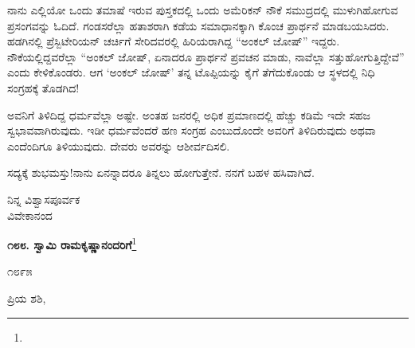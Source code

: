 ನಾನು ಎಲ್ಲಿಯೋ ಒಂದು ತಮಾಷೆ ಇರುವ ಪುಸ್ತಕದಲ್ಲಿ ಒಂದು ಅಮೆರಿಕನ್ ನೌಕೆ ಸಮುದ್ರದಲ್ಲಿ ಮುಳುಗಿಹೋಗುವ ಪ್ರಸಂಗವನ್ನು ಓದಿದೆ. ಗಂಡಸರೆಲ್ಲಾ ಹತಾಶರಾಗಿ ಕಡೆಯ ಸಮಾಧಾನಕ್ಕಾಗಿ ಕೊಂಚ ಪ್ರಾರ್ಥನೆ ಮಾಡಬಯಸಿದರು. ಹಡಗಿನಲ್ಲಿ ಪ್ರೆಸ್ಬಿಟೇರಿಯನ್ ಚರ್ಚಿಗೆ ಸೇರಿದವರಲ್ಲಿ ಹಿರಿಯರಾಗಿದ್ದ “ಅಂಕಲ್ ಜೋಷ್'' ಇದ್ದರು. ನೌಕೆಯಲ್ಲಿದ್ದವರೆಲ್ಲಾ “ಅಂಕಲ್ ಜೋಷ್, ಏನಾದರೂ ಪ್ರಾರ್ಥನೆ ಪ್ರವಚನ ಮಾಡು, ನಾವೆಲ್ಲಾ ಸತ್ತುಹೋಗುತ್ತಿದ್ದೇವೆ'' ಎಂದು ಕೇಳಿಕೊಂಡರು. ಆಗ `ಅಂಕಲ್ ಜೋಷ್' ತನ್ನ ಟೊಪ್ಪಿಯನ್ನು ಕೈಗೆ ತೆಗೆದುಕೊಂಡು ಆ ಸ್ಥಳದಲ್ಲಿ ನಿಧಿ ಸಂಗ್ರಹಕ್ಕೆ ತೊಡಗಿದ!

ಅವನಿಗೆ ತಿಳಿದಿದ್ದ ಧರ್ಮವೆಲ್ಲಾ ಅಷ್ಟೇ. ಅಂತಹ ಜನರಲ್ಲಿ ಅಧಿಕ ಪ್ರಮಾಣದಲ್ಲಿ ಹೆಚ್ಚು ಕಡಿಮೆ ಇದೇ ಸಹಜ ಸ್ವಭಾವವಾಗಿರುವುದು. ಇಡೀ ಧರ್ಮವೆಂದರೆ ಹಣ ಸಂಗ್ರಹ ಎಂಬುದೊಂದೇ ಅವರಿಗೆ ತಿಳಿದಿರುವುದು ಅಥವಾ ಎಂದೆಂದಿಗೂ ತಿಳಿಯುವುದು. ದೇವರು ಅವರನ್ನು ಆಶೀರ್ವದಿಸಲಿ.

ಸದ್ಯಕ್ಕೆ ಶುಭಮಸ್ತು!ನಾನು ಏನನ್ನಾದರೂ ತಿನ್ನಲು ಹೋಗುತ್ತೇನೆ. ನನಗೆ ಬಹಳ ಹಸಿವಾಗಿದೆ.

\vspace{-0.5cm}

{\flushright
ನಿನ್ನ ವಿಶ್ವಾಸಪೂರ್ವಕ\\ವಿವೇಕಾನಂದ\par}

\begin{center}
\textbf{೧೮೮. ಸ್ವಾಮಿ ರಾಮಕೃಷ್ಣಾನಂದರಿಗೆ}\footnote{}
\end{center}

\vspace{-0.5cm}

\begin{flushright}
೧೮೯೫
\end{flushright}

\vspace{-0.3cm}

\noindent
ಪ್ರಿಯ ಶಶಿ,

